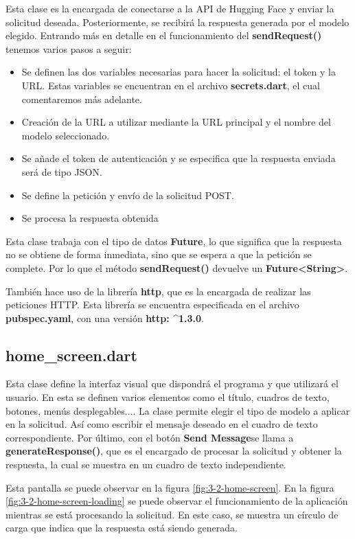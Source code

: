 \documentclass[12pt]{article}
\begin{document}
Esta clase es la encargada de conectarse a la API de Hugging Face y enviar la solicitud deseada. Posteriormente, se recibirá la respuesta generada por el modelo elegido. Entrando más en detalle en el funcionamiento del \textbf{sendRequest()} tenemos varios pasos a seguir:

\begin{itemize}
    \item Se definen las dos variables necesarias para hacer la solicitud: el token y la URL. Estas variables se encuentran en el archivo \textbf{secrets.dart}, el cual comentaremos más adelante.
    \item Creación de la URL a utilizar mediante la URL principal y el nombre del modelo seleccionado.
    \item Se añade el token de autenticación y se especifica que la respuesta enviada será de tipo JSON.
    \item Se define la petición y envío de la solicitud POST.
    \item Se procesa la respuesta obtenida
\end{itemize}

Esta clase trabaja con el tipo de datos \textbf{Future}, lo que significa que la respuesta no se obtiene de forma inmediata, sino que se espera a que la petición se complete. Por lo que el método \textbf{sendRequest()} devuelve un \textbf{Future<String>}.

También hace uso de la librería \textbf{http}, que es la encargada de realizar las peticiones HTTP. Esta librería se encuentra especificada en el archivo \textbf{pubspec.yaml}, con una versión \textbf{http: \^{}1.3.0}.

\subsection{home\_screen.dart}

Esta clase define la interfaz visual que dispondrá el programa y que utilizará el usuario. En esta se definen varios elementos como el título, cuadros de texto, botones, menús desplegables.... La clase permite elegir el tipo de modelo a aplicar en la solicitud. Así como escribir el mensaje deseado en el cuadro de texto correspondiente. Por último, con el botón \textbf{Send Message}se llama a \textbf{generateResponse()}, que es el encargado de procesar la solicitud y obtener la respuesta, la cual se muestra en un cuadro de texto independiente.

Esta pantalla se puede observar en la figura \ref{fig:3-2-home-screen}.
En la figura \ref{fig:3-2-home-screen-loading} se puede observar el funcionamiento de la aplicación mientras se está procesando la solicitud. En este caso, se muestra un círculo de carga que indica que la respuesta está siendo generada.
\end{document}
